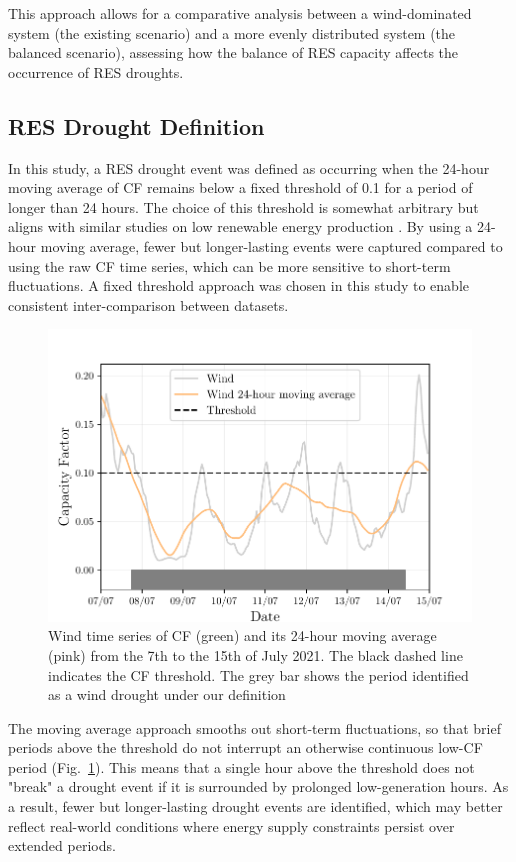 \documentclass[a4paper, 11pt]{article}
\begin{document}
This approach allows for a comparative analysis between a wind-dominated system (the existing scenario) and a more evenly distributed system (the balanced scenario), assessing how the balance of RES capacity affects the occurrence of RES droughts.

\subsection{RES Drought Definition}
\label{sec:res_drought}

In this study, a RES drought event was defined as occurring when the 24-hour moving average of CF remains below a fixed threshold of 0.1 for a period of longer than 24 hours. The choice of this threshold is somewhat arbitrary but aligns with similar studies on low renewable energy production \cite{kaspar2019drought, ohba2022drought, mayer2023drought}. By using a 24-hour moving average, fewer but longer-lasting events were captured compared to using the raw CF time series, which can be more sensitive to short-term fluctuations. A fixed threshold approach was chosen in this study to enable consistent inter-comparison between datasets.

\begin{figure}[ht!]
	\centering
	\includegraphics{droughts_methodology}
	\caption{Wind time series of CF (green) and its 24-hour moving average (pink) from the 7th to the 15th of July 2021. The black dashed line indicates the CF threshold. The grey bar shows the period identified as a wind drought under our definition}
	\label{fig:find_res_droughts}
\end{figure}

The moving average approach smooths out short-term fluctuations, so that brief periods above the threshold do not interrupt an otherwise continuous low-CF period (Fig.~\ref{fig:find_res_droughts}). This means that a single hour above the threshold does not "break" a drought event if it is surrounded by prolonged low-generation hours. As a result, fewer but longer-lasting drought events are identified, which may better reflect real-world conditions where energy supply constraints persist over extended periods.
\end{document}
